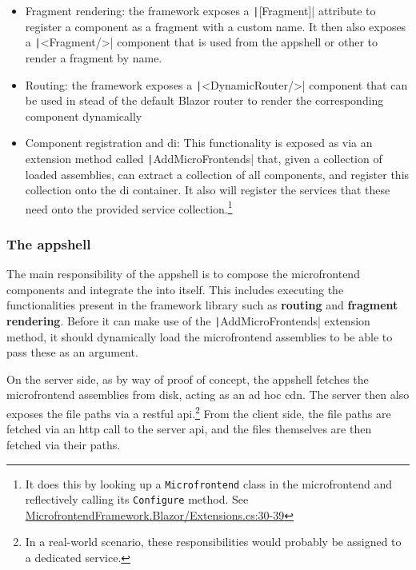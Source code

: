 \begin{itemize}
  \item Fragment rendering: the framework exposes a
  \texttt|[Fragment]| attribute to register a component as a
  fragment with a custom name. It then also exposes a
  \texttt|<Fragment/>| component that is used from the \gls{appshell}
  or other  to render a fragment by name.
  \item Routing: the framework exposes a \texttt|<DynamicRouter/>|
  component that can be used in stead of the default Blazor router to render the
  corresponding component dynamically
  \item Component registration and \gls{di}: This functionality is exposed as
  via an extension method called \texttt|AddMicroFrontends| that,
  given a collection of loaded assemblies, can extract a collection of all
  components, and register this collection onto the \gls{di} container. It also
  will register the services that these  need onto the
  provided service collection.\footnote{It does this by looking up a
  \texttt{Microfrontend} class in the \gls{microfrontend} and reflectively
  calling its \texttt{Configure} method. See
  \href{https://github.com/DanteDeRuwe/bachelor-thesis-code/blob/main/src/framework/MicrofrontendFramework.Blazor/Extensions.cs\#L30-L39}{MicrofrontendFramework.Blazor/Extensions.cs:30-39}}
\end{itemize}

\subsubsection[The application shell]{The \gls{appshell}}

The main responsibility of the \gls{appshell} is to compose the
\gls{microfrontend} components and integrate the  into
itself. This includes executing the functionalities present in the framework
library such as \textbf{routing} and \textbf{fragment rendering}. Before it can
make use of the \texttt|AddMicroFrontends| extension method, it
should dynamically load the \gls{microfrontend} assemblies to be able to pass these as
an argument.

On the server side, as by way of proof of concept, the \gls{appshell} fetches
the \gls{microfrontend} assemblies from disk, acting as an ad hoc \gls{cdn}. The
server then also exposes the file paths via a \gls{restful}
\gls{api}.\footnote{In a real-world scenario, these responsibilities would
probably be assigned to a dedicated service.} From the client side, the file
paths are fetched via an \gls{http} call to the server \gls{api}, and the files
themselves are then fetched via their paths.

